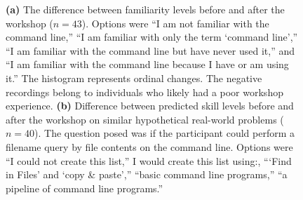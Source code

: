 \documentclass[10pt, twocolumn]{article}
\begin{document}
\begin{figure}
\begin{subfigure}[t]{0.47\columnwidth}
\end{subfigure}
\caption{
    \textbf{(a)} The difference between familiarity levels before and after the workshop ($n=43$). 
    Options were ``I am not familiar with the command line,'' 
    ``I am familiar with only the term `command line','' 
    ``I am familiar with the command line but have never used it,'' 
    and ``I am familiar with the command line because I have or am using it.'' 
    The histogram represents ordinal changes. 
    The negative recordings belong to individuals
    who likely had a poor workshop experience.
    \textbf{(b)} Difference between predicted skill levels 
    before and after the workshop on similar hypothetical real-world problems ($n=40$). 
    The question posed was if the participant could perform a filename query by file contents on the command line. 
    Options were ``I could not create this list,'' 
    I would create this list using:, 
    ```Find in Files' and `copy \& paste','' 
    ``basic command line programs,'' 
    ``a pipeline of command line programs.''
    }
\label{shellFamiliarityAndSkill}
\end{figure}
\end{document}
